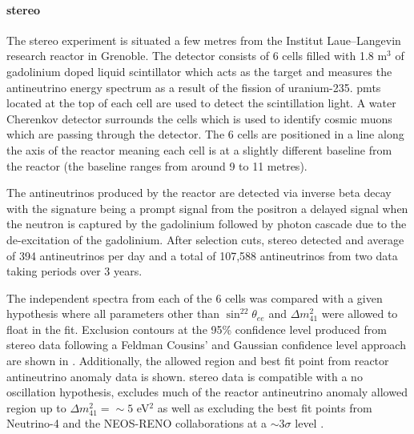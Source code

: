 \newpage
\paragraph{\gls{stereo}}
The \gls{stereo} experiment is situated a few metres from the Institut Laue–Langevin research reactor in Grenoble. The detector consists of 6 cells filled with 1.8 m$^3$ of gadolinium doped liquid scintillator which acts as the target and measures the antineutrino energy spectrum as a result of the fission of uranium-235. \glspl{pmt} located at the top of each cell are used to detect the scintillation light. A water Cherenkov detector surrounds the cells which is used to identify cosmic muons which are passing through the detector. The 6 cells are positioned in a line along the axis of the reactor meaning each cell is at a slightly different baseline from the reactor (the baseline ranges from around 9 to 11 metres). 

The antineutrinos produced by the reactor are detected via inverse beta decay with the signature being a prompt signal from the positron a delayed signal when the neutron is captured by the gadolinium followed by photon cascade due to the de-excitation of the gadolinium. After selection cuts, \gls{stereo} detected and average of 394 antineutrinos per day and a total of 107,588 antineutrinos from two data taking periods over 3 years.  

The independent spectra from each of the 6 cells was compared with a given hypothesis where all parameters other than $\sin^22\theta_{ee}$ and $\Delta m^2_{41}$ were allowed to float in the fit. Exclusion contours at the 95\% confidence level produced from \gls{stereo} data following a Feldman Cousins' and Gaussian confidence level approach are shown in . Additionally, the allowed region and best fit point from reactor antineutrino anomaly data is shown. \gls{stereo} data is compatible with a no oscillation hypothesis, excludes much of the reactor antineutrino anomaly allowed region up to $\Delta m^2_{41} = \sim 5$ eV$^2$ as well as excluding the best fit points from Neutrino-4 and the NEOS-RENO collaborations at a $\sim 3\sigma$ level \cite{STEREO}. 

